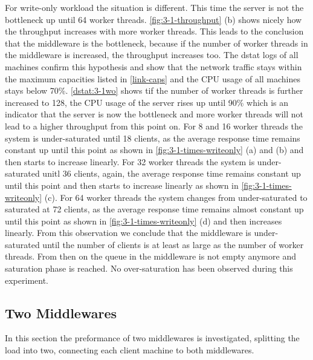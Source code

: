 \documentclass[11pt,a4paper]{article}
\begin{document}
For write-only workload the situation is different. This time the server is not the bottleneck up until 64 worker threads. \autoref{fig:3-1-throughput} (b) shows nicely how the throughput increases with more worker threads. This leads to the conclusion that the middleware is the bottleneck, because if the number of worker threads in the middleware is increased, the throughput increases too. The dstat logs of all machines confirm this hypothesis and show that the network traffic stays within the maximum capacities listed in \autoref{link-caps} and the CPU usage of all machines stays below 70\%.
\autoref{dstat:3-1wo} shows tif the number of worker threads is further increased to 128, the CPU usage of the server rises up until 90\% which is an indicator that the server is now the bottleneck and more worker threads will not lead to a higher throughput from this point on.
For 8 and 16 worker threads the system is under-saturated until 18 clients, as the average response time remains constant up until this point as shown in \autoref{fig:3-1-times-writeonly} (a) and (b) and then starts to increase linearly.
For 32 worker threads the system is under-saturated unitl 36 clients, again, the average response time remains constant up until this point and then starts to increase linearly as shown in \autoref{fig:3-1-times-writeonly} (c).
For 64 worker threads the system changes from under-saturated to saturated at 72 clients, as the average response time remains almost constant up until this point as shown in \autoref{fig:3-1-times-writeonly} (d) and then increases linearly.
From this observation we conclude that the middleware is under-saturated until the number of clients is at least as large as the number of worker threads. From then on the queue in the middleware is not empty anymore and saturation phase is reached.
No over-saturation has been observed during this experiment.



\subsection{Two Middlewares} \label{sec3.2}

In this section the preformance of two middlewares is investigated, splitting the load into two, connecting each client machine to both middlewares.
\end{document}
